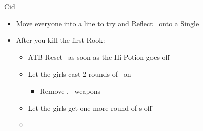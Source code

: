 \begin{battle}{Cid}
	\begin{itemize}
		\item Move everyone into a line to try and Reflect \bio\ onto a Single 
		      \beliasfreeze{}
		\item After you kill the first Rook:
		      \begin{itemize}
			      \vaanf Hi-Potion
			      \penelof \bio\  (D if C is dead)
			      \ashef \bio\   (D if C is dead)
			      \vaanf Traveler  (D if C is dead)
			      \item ATB Reset \vaan\ as soon as the Hi-Potion goes off
			      \item Let the girls cast 2 rounds of \bio\ on 
			            \begin{menu}
				            \begin{itemize}
					            \item Remove \ashe, \penelo\ weapons
					                  \battleactive
				            \end{itemize}
			            \end{menu}
			      \item Let the girls get one more round of \bio s off
			      \item \GirlsGambitOff
		      \end{itemize}
	\end{itemize}
\end{battle}